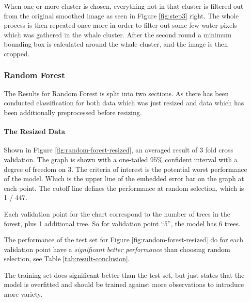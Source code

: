 When one or more cluster is chosen, everything not in that cluster is filtered out from the original smoothed image as seen in Figure \ref{fig:step3} right. The whole process is then repeated once more in order to filter out some few water pixels which was gathered in the whale cluster.
After the second round a minimum bounding box is calculated around the whale cluster, and the image is then cropped.



\subsubsection{Random Forest}
The Results for Random Forest is split into two sections. As there has been conducted classification for both data which was just resized and data which has been additionally preprocessed before resizing.

\paragraph{The Resized Data}
\label{par:rf-resized}
Shown in Figure \ref{fig:random-forest-resized}, an averaged result of 3 fold cross validation. The graph is shown with a one-tailed 95\% confident interval with a degree of freedom on 3. The criteria of interest is the potential worst performance of the model. Which is the upper line of the embedded error bar on the graph at each point. The cutoff line defines the performance at random selection, which is 1 / 447. 

Each validation point for the chart correspond to the number of trees in the forest, plus 1 additional tree. So for validation point ``5'', the model has 6 trees.

The performance of the test set for Figure \ref{fig:random-forest-resized} do for each validation point have a \emph{significant better performance} than choosing random selection, see Table \ref{tab:result-conclusion}.

The training set does significant better than the test set, but just states that the model is overfitted and should be trained against more observations to introduce more variety.

